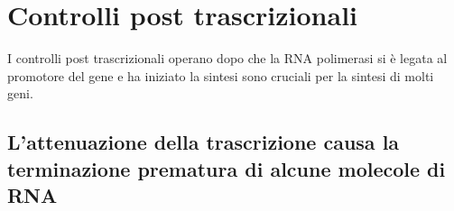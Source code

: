 \section{Controlli post trascrizionali}
I controlli post trascrizionali operano dopo che la RNA polimerasi si \`e legata al promotore del gene e ha iniziato la sintesi sono cruciali per la sintesi di molti geni. 
\subsection{L'attenuazione della trascrizione causa la terminazione prematura di alcune molecole di RNA}


